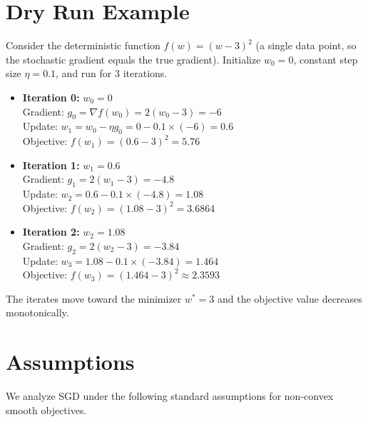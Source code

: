 \documentclass{article}
\begin{document}
\section*{Dry Run Example}
Consider the deterministic function $f(w) = (w-3)^2$ (a single data point, so the stochastic gradient equals the true gradient). Initialize $w_0 = 0$, constant step size $\eta = 0.1$, and run for $3$ iterations.

\begin{itemize}
    \item \textbf{Iteration 0:} $w_0 = 0$ \\
          Gradient: $g_0 = \nabla f(w_0) = 2(w_0-3) = -6$ \\
          Update: $w_1 = w_0 - \eta g_0 = 0 - 0.1 \times (-6) = 0.6$ \\
          Objective: $f(w_1) = (0.6-3)^2 = 5.76$
    \item \textbf{Iteration 1:} $w_1 = 0.6$ \\
          Gradient: $g_1 = 2(w_1-3) = -4.8$ \\
          Update: $w_2 = 0.6 - 0.1 \times (-4.8) = 1.08$ \\
          Objective: $f(w_2) = (1.08-3)^2 = 3.6864$
    \item \textbf{Iteration 2:} $w_2 = 1.08$ \\
          Gradient: $g_2 = 2(w_2-3) = -3.84$ \\
          Update: $w_3 = 1.08 - 0.1 \times (-3.84) = 1.464$ \\
          Objective: $f(w_3) = (1.464-3)^2 \approx 2.3593$
\end{itemize}
The iterates move toward the minimizer $w^* = 3$ and the objective value decreases monotonically.

\section*{Assumptions}
We analyze SGD under the following standard assumptions for non-convex smooth objectives.
\end{document}
